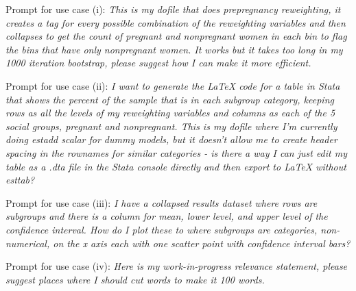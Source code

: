 \documentclass[12pt]{article}
\begin{document}
Prompt for use case (i):
\emph{This is my dofile that does prepregnancy reweighting, it creates a tag for every possible combination of the reweighting variables and then collapses to get the count of pregnant and nonpregnant women in each bin to flag the bins that have only nonpregnant women. It works but it takes too long in my 1000 iteration bootstrap, please suggest how I can make it more efficient.} 

Prompt for use case (ii):
\emph{I want to generate the LaTeX code for a table in Stata that shows the percent of the sample that is in each subgroup category, keeping rows as all the levels of my reweighting variables and columns as each of the 5 social groups, pregnant and nonpregnant. This is my dofile where I'm currently doing estadd scalar for dummy models, but it doesn't allow me to create header spacing in the rownames for similar categories - is there a way I can just edit my table as a .dta file in the Stata console directly and then export to LaTeX without esttab?}

Prompt for use case (iii): 
\emph{I have a collapsed results dataset where rows are subgroups and there is a column for mean, lower level, and upper level of the confidence interval. How do I plot these to where subgroups are categories, non-numerical, on the x axis each with one scatter point with confidence interval bars?}

Prompt for use case (iv):
\emph{Here is my work-in-progress relevance statement, please suggest places where I should cut words to make it 100 words.}

\newpage



\end{document}
